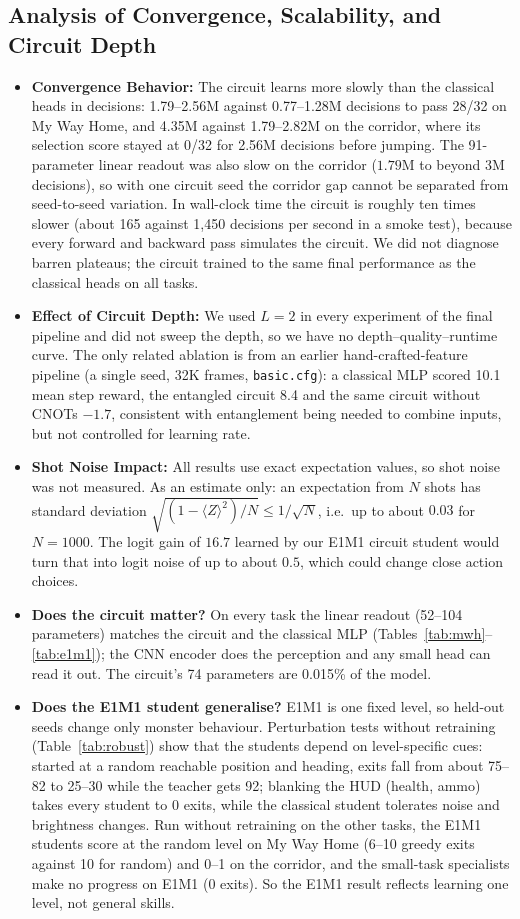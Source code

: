 \documentclass[10pt, a4paper]{article}
\begin{document}
\subsection{Analysis of Convergence, Scalability, and Circuit Depth}
\begin{itemize}
    \item \textbf{Convergence Behavior:} The circuit learns more slowly than the classical heads in decisions: 1.79--2.56M against 0.77--1.28M decisions to pass 28/32 on My Way Home, and 4.35M against 1.79--2.82M on the corridor, where its selection score stayed at 0/32 for 2.56M decisions before jumping. The 91-parameter linear readout was also slow on the corridor ($1.79$M to beyond 3M decisions), so with one circuit seed the corridor gap cannot be separated from seed-to-seed variation. In wall-clock time the circuit is roughly ten times slower (about 165 against 1,450 decisions per second in a smoke test), because every forward and backward pass simulates the circuit. We did not diagnose barren plateaus; the circuit trained to the same final performance as the classical heads on all tasks.
    \item \textbf{Effect of Circuit Depth:} We used $L=2$ in every experiment of the final pipeline and did not sweep the depth, so we have no depth--quality--runtime curve. The only related ablation is from an earlier hand-crafted-feature pipeline (a single seed, 32K frames, \texttt{basic.cfg}): a classical MLP scored 10.1 mean step reward, the entangled circuit 8.4 and the same circuit without CNOTs $-1.7$, consistent with entanglement being needed to combine inputs, but not controlled for learning rate.
    \item \textbf{Shot Noise Impact:} All results use exact expectation values, so shot noise was not measured. As an estimate only: an expectation from $N$ shots has standard deviation $\sqrt{(1-\langle Z\rangle^2)/N}\le 1/\sqrt{N}$, i.e.\ up to about $0.03$ for $N=1000$. The logit gain of $16.7$ learned by our E1M1 circuit student would turn that into logit noise of up to about $0.5$, which could change close action choices.
    \item \textbf{Does the circuit matter?} On every task the linear readout (52--104 parameters) matches the circuit and the classical MLP (Tables~\ref{tab:mwh}--\ref{tab:e1m1}); the CNN encoder does the perception and any small head can read it out. The circuit's 74 parameters are 0.015\% of the model.
    \item \textbf{Does the E1M1 student generalise?} E1M1 is one fixed level, so held-out seeds change only monster behaviour. Perturbation tests without retraining (Table~\ref{tab:robust}) show that the students depend on level-specific cues: started at a random reachable position and heading, exits fall from about 75--82 to 25--30 while the teacher gets 92; blanking the HUD (health, ammo) takes every student to 0 exits, while the classical student tolerates noise and brightness changes. Run without retraining on the other tasks, the E1M1 students score at the random level on My Way Home (6--10 greedy exits against 10 for random) and 0--1 on the corridor, and the small-task specialists make no progress on E1M1 (0 exits). So the E1M1 result reflects learning one level, not general skills.

\end{itemize}
\end{document}
